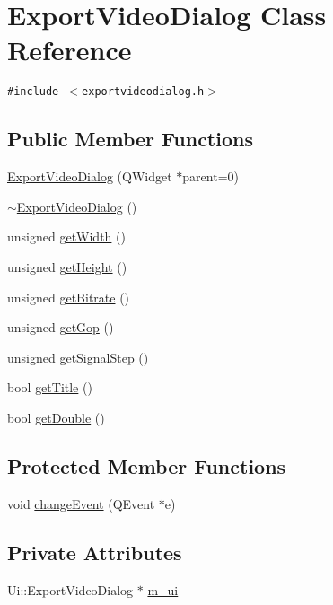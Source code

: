 \hypertarget{class_export_video_dialog}{
\section{ExportVideoDialog Class Reference}
\label{class_export_video_dialog}
}
{\tt \#include $<$exportvideodialog.h$>$}

\subsection*{Public Member Functions}
\begin{CompactItemize}
\item 
\hyperlink{class_export_video_dialog_d2268ac67b60a71671e50f400cc3ef61}{ExportVideoDialog} (QWidget $\ast$parent=0)
\item 
\hyperlink{class_export_video_dialog_6fb9e39694b0eed912c490483a8643e4}{$\sim$ExportVideoDialog} ()
\item 
unsigned \hyperlink{class_export_video_dialog_7362ec377ee65b540958211872d5d462}{getWidth} ()
\item 
unsigned \hyperlink{class_export_video_dialog_d0cb813fdcda93906e1ef020b0bb711c}{getHeight} ()
\item 
unsigned \hyperlink{class_export_video_dialog_3005ac15f33b801783bf8772e8ac4b8b}{getBitrate} ()
\item 
unsigned \hyperlink{class_export_video_dialog_f103588321a636a793426987cfc9ae1b}{getGop} ()
\item 
unsigned \hyperlink{class_export_video_dialog_5218c180d26cd1c5448e542986056485}{getSignalStep} ()
\item 
bool \hyperlink{class_export_video_dialog_7f1af40e771f107e76ec90f2dd8449d2}{getTitle} ()
\item 
bool \hyperlink{class_export_video_dialog_837ee7d9a0e1ba636f7d0668993d5292}{getDouble} ()
\end{CompactItemize}
\subsection*{Protected Member Functions}
\begin{CompactItemize}
\item 
void \hyperlink{class_export_video_dialog_c9ce9ba5ce74293d16b332f7847c9ed9}{changeEvent} (QEvent $\ast$e)
\end{CompactItemize}
\subsection*{Private Attributes}
\begin{CompactItemize}
\item 
Ui::ExportVideoDialog $\ast$ \hyperlink{class_export_video_dialog_a95d79216bb3533116b5f1f40c5aff75}{m\_\-ui}
\end{CompactItemize}


